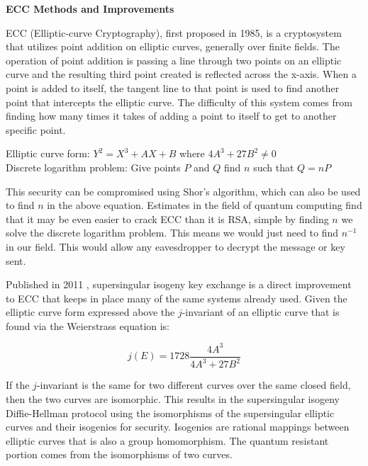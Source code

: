 \documentclass[12pt]{article}
\begin{document}
	\par\vspace{1mm}
	

\begin{center}
	{\large \bf ECC Methods and Improvements}
\end{center}

ECC (Elliptic-curve Cryptography), first proposed in 1985\cite{ecc1}, is a cryptosystem that utilizes point addition on elliptic curves, generally over finite fields. The operation of point addition is passing a line through two points on an elliptic curve and the resulting third point created is reflected across the x-axis. When a point is added to itself, the tangent line to that point is used to find another point that intercepts the elliptic curve. The difficulty of this system comes from finding how many times it takes of adding a point to itself to get to another specific point\cite{crypto}.

\begin{center}
    Elliptic curve form: $Y^2=X^3+AX+B$ where $4A^3 + 27B^2 \ne 0$\\
    Discrete logarithm problem: Give points $P$ and $Q$ find $n$ such that $Q=nP$
\end{center}

This security can be compromised using Shor's algorithm, which can also be used to find $n$ in the above equation.  Estimates in the field of quantum computing find that it may be even easier to crack ECC than it is RSA, simple by finding $n$ we solve the discrete logarithm problem. This means we would just need to find $n^{-1}$ in our field. This would allow any eavesdropper to decrypt the message or key sent\cite{andrea}.

Published in 2011 \cite{ECC}, supersingular isogeny key exchange is a direct improvement to ECC that keeps in place many of the same systems already used. Given the elliptic curve form expressed above the $j$-invariant of an elliptic curve that is found via the Weierstrass equation is:\cite{ECC}

$$j(E)=1728\frac{4A^3}{4A^3+27B^2}$$

If the $j$-invariant is the same for two different curves over the same closed field, then the two curves are isomorphic. This results in the supersingular isogeny Diffie-Hellman protocol using the isomorphisms of the supersingular elliptic curves and their isogenies for security. Isogenies are rational mappings between elliptic curves that is also a group homomorphism. The quantum resistant portion comes from the isomorphisms of two curves\cite{ECC}.\\
\end{document}
